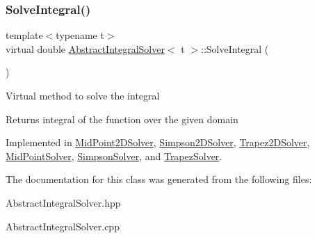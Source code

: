\subsubsection{\texorpdfstring{Solve\+Integral()}{SolveIntegral()}}
{\footnotesize\ttfamily template$<$typename t$>$ \\
virtual double \hyperlink{class_abstract_integral_solver}{Abstract\+Integral\+Solver}$<$ t $>$\+::Solve\+Integral (\begin{DoxyParamCaption}{ }\end{DoxyParamCaption})\hspace{0.3cm}{\ttfamily [pure virtual]}}

Virtual method to solve the integral \begin{DoxyReturn}{Returns}
integral of the function over the given domain 
\end{DoxyReturn}


Implemented in \hyperlink{class_mid_point2_d_solver_a45c6c6802b7d40c35f1f60f1a39f5042}{Mid\+Point2\+D\+Solver}, \hyperlink{class_simpson2_d_solver_a3fc19037fef83ad05381138d9f7da939}{Simpson2\+D\+Solver}, \hyperlink{class_trapez2_d_solver_a88f724ff6fd2c566d54f5d0ccc500cb9}{Trapez2\+D\+Solver}, \hyperlink{class_mid_point_solver_a3e7224a0fb07b3ef7f5f9e7e577216cf}{Mid\+Point\+Solver}, \hyperlink{class_simpson_solver_a4843e8bfc0344d9a9cae8688d1114667}{Simpson\+Solver}, and \hyperlink{class_trapez_solver_a15651e2fba081b87b484a83fc424c81d}{Trapez\+Solver}.



The documentation for this class was generated from the following files\+:\begin{DoxyCompactItemize}
\item 
Abstract\+Integral\+Solver.\+hpp\item 
Abstract\+Integral\+Solver.\+cpp\end{DoxyCompactItemize}
